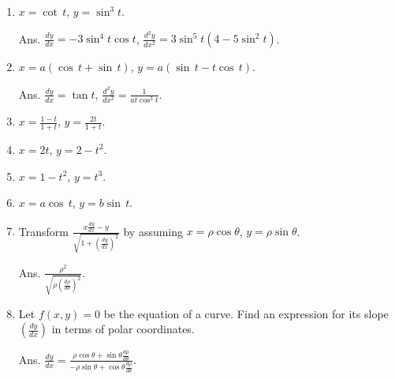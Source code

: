 \begin{enumerate}
\item
$x = \cot\, t$, $y = \sin^3t$. 	

Ans. 
$\frac{dy}{dx} = -3 \sin^4 t \cos t$, 
$\frac{d^2 y}{dx^2} = 3 \sin^5 t (4 - 5 \sin^2 t)$.

\item
$x = a(\cos\, t + \sin\, t)$, $y = a(\sin\, t - t\cos\, t)$. 	

Ans. $\frac{dy}{dx} = \tan t$, $\frac{d^2 y}{dx^2} = \frac{1}{at \cos^3 t}$.

\item
$x = \frac{1 - t}{1 + t}$, $y = \frac{2t}{1 + t}$.

\item
$x = 2t$, $y = 2 - t^2$.

\item
$x = 1 - t^2$, $y = t^3$.

\item
$x = a\cos\, t$, $y = b\sin\, t$.

\item
Transform 
$\frac{ x \frac{dy}{dx} - y}{ \sqrt{1 
+ \left( \frac{dy}{dx} \right)^2} }$ by assuming 
$x = \rho \cos\theta$, $y = \rho \sin\theta$.

Ans. $\frac{\rho^2}{ \sqrt{ \rho \left( \frac{d\rho}{d\theta} \right)^2 } }$.

\item
Let $f(x,y) = 0$ be the equation of a curve. Find an expression for 
its slope $\left( \frac{dy}{dx} \right)$ in terms of polar coordinates.

Ans. 
$\frac{dy}{dx} = \frac{ \rho \cos \theta 
+ \sin \theta \frac{d\rho}{d\theta} }{ -\rho \sin \theta 
+ \cos \theta \frac{d\rho}{d\theta} }$.

\end{enumerate}
